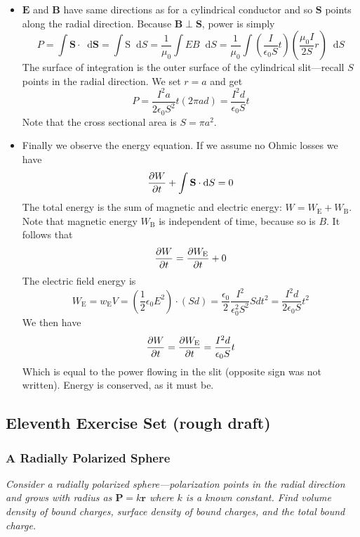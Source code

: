 \documentclass[11pt, a4paper]{article}
\newcommand{\diff}{\mathop{}\!\mathrm{d}} %
\renewcommand{\vec}[1]{\bm{#1}} %
\renewcommand{\r}{\vec{r}}
\newcommand{\E}{\vec{E}}  %
\newcommand{\B}{\vec{B}}  %
\renewcommand{\S}{\mathbf{S}}  %
\renewcommand{\SS}{\mathrm{S}}  %
\newcommand{\ee}{\epsilon_{0}}  %
\newcommand{\mm}{\mu_{0}}  %
\newcommand{\m}{\vec{m}}  %
\renewcommand{\P}{\vec{P}}  %
\begin{document}
\begin{itemize}
	\item $ \E $ and $ \B $ have same directions as for a cylindrical conductor and so $ \S $ points along the radial direction. Because $ \B \perp \S$, power is simply
	\begin{equation*}
		P = \int \S \cdot \diff \vec{S} = \int \SS \diff S = \frac{1}{\mm}\int EB \diff S = \frac{1}{\mm} \int  \left(\frac{I}{\ee S}t\right)\left(\frac{\mm I}{2S} r\right) \diff S
	\end{equation*}
	The surface of integration is the outer surface of the cylindrical slit---recall $ S $ points in the radial direction. We set $ r = a $ and get
	\begin{equation*}
		P = \frac{I^{2}a}{2\ee S^{2}}t (2\pi a d) = \frac{I^{2}d}{\ee S} t
	\end{equation*}
	Note that the cross sectional area is $ S = \pi a^{2} $. 
	
	\item  Finally we observe the energy equation. If we assume no Ohmic losses we have
	\begin{equation*}
		\pdv{W}{t} + \int \S \cdot \diff S = 0
	\end{equation*}
	The total energy is the sum of magnetic and electric energy: $ W = W_{\text{E}} + W_{\text{B}} $. Note that magnetic energy $ W_{\text{B}} $ is independent of time, because so is $ B $. It follows that
	\begin{equation*}
		\pdv{W}{t} = \pdv{W_{\text{E}}}{t} + 0
	\end{equation*}
	The electric field energy is 
	\begin{equation*}
		W_{\text{E}} = w_{\text{E}}V = \left(\frac{1}{2} \ee E^{2}\right) \cdot \left(Sd\right) = \frac{\ee}{2}\frac{I^{2}}{\ee^{2}S^{2}}Sdt^{2} = \frac{I^{2}d}{2\ee S}t^{2}
	\end{equation*}
	We then have
	\begin{equation*}
		\pdv{W}{t} = \pdv{W_{\text{E}}}{t} = \frac{I^{2}d}{\ee S} t
	\end{equation*}
	Which is equal to the power flowing in the slit (opposite sign was not written). Energy is conserved, as it must be.
\end{itemize}

\subsection{Eleventh Exercise Set (rough draft)}

\subsubsection{A Radially Polarized Sphere}
\textit{Consider a radially polarized sphere---polarization points in the radial direction and grows with radius as $ \P = k \r $ where $ k $ is a known constant. Find volume density of bound charges, surface density of bound charges, and the total bound charge.}
\end{document}
